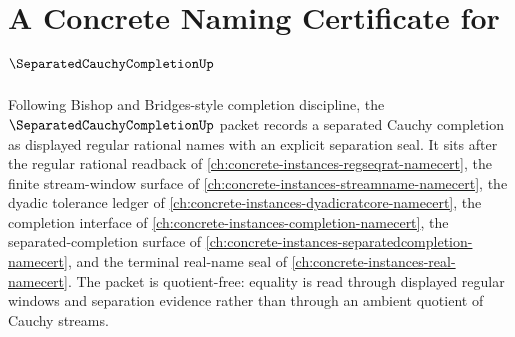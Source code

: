 \chapter{A Concrete Naming Certificate for $\SeparatedCauchyCompletionUp$}
\label{ch:concrete-instances-separated-cauchy-completion-namecert}

Following Bishop and Bridges-style completion discipline, the $\SeparatedCauchyCompletionUp$ packet records a separated Cauchy completion as displayed regular rational names with an explicit separation seal. It sits after the regular rational readback of \autoref{ch:concrete-instances-regseqrat-namecert}, the finite stream-window surface of \autoref{ch:concrete-instances-streamname-namecert}, the dyadic tolerance ledger of \autoref{ch:concrete-instances-dyadicratcore-namecert}, the completion interface of \autoref{ch:concrete-instances-completion-namecert}, the separated-completion surface of \autoref{ch:concrete-instances-separatedcompletion-namecert}, and the terminal real-name seal of \autoref{ch:concrete-instances-real-namecert}. The packet is quotient-free: equality is read through displayed regular windows and separation evidence rather than through an ambient quotient of Cauchy streams.

